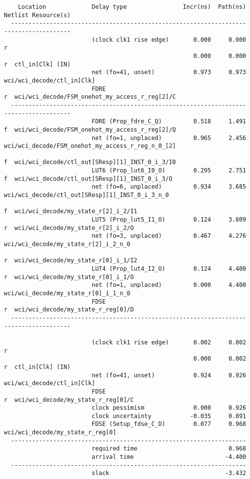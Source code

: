 \documentclass{article}
\begin{document}
\begin{lstlisting}
    Location             Delay type                Incr(ns)  Path(ns)    Netlist Resource(s)
  -------------------------------------------------------------------    -------------------
                         (clock clk1 rise edge)       0.000     0.000 r  
                                                      0.000     0.000 r  ctl_in[Clk] (IN)
                         net (fo=41, unset)           0.973     0.973    wci/wci_decode/ctl_in[Clk]
                         FDRE                                         r  wci/wci_decode/FSM_onehot_my_access_r_reg[2]/C
  -------------------------------------------------------------------    -------------------
                         FDRE (Prop_fdre_C_Q)         0.518     1.491 f  wci/wci_decode/FSM_onehot_my_access_r_reg[2]/Q
                         net (fo=1, unplaced)         0.965     2.456    wci/wci_decode/FSM_onehot_my_access_r_reg_n_0_[2]
                                                                      f  wci/wci_decode/ctl_out[SResp][1]_INST_0_i_3/I0
                         LUT6 (Prop_lut6_I0_O)        0.295     2.751 f  wci/wci_decode/ctl_out[SResp][1]_INST_0_i_3/O
                         net (fo=6, unplaced)         0.934     3.685    wci/wci_decode/ctl_out[SResp][1]_INST_0_i_3_n_0
                                                                      f  wci/wci_decode/my_state_r[2]_i_2/I1
                         LUT5 (Prop_lut5_I1_O)        0.124     3.809 r  wci/wci_decode/my_state_r[2]_i_2/O
                         net (fo=3, unplaced)         0.467     4.276    wci/wci_decode/my_state_r[2]_i_2_n_0
                                                                      r  wci/wci_decode/my_state_r[0]_i_1/I2
                         LUT4 (Prop_lut4_I2_O)        0.124     4.400 r  wci/wci_decode/my_state_r[0]_i_1/O
                         net (fo=1, unplaced)         0.000     4.400    wci/wci_decode/my_state_r[0]_i_1_n_0
                         FDSE                                         r  wci/wci_decode/my_state_r_reg[0]/D
  -------------------------------------------------------------------    -------------------

                         (clock clk1 rise edge)       0.002     0.002 r  
                                                      0.000     0.002 r  ctl_in[Clk] (IN)
                         net (fo=41, unset)           0.924     0.926    wci/wci_decode/ctl_in[Clk]
                         FDSE                                         r  wci/wci_decode/my_state_r_reg[0]/C
                         clock pessimism              0.000     0.926    
                         clock uncertainty           -0.035     0.891    
                         FDSE (Setup_fdse_C_D)        0.077     0.968    wci/wci_decode/my_state_r_reg[0]
  -------------------------------------------------------------------
                         required time                          0.968    
                         arrival time                          -4.400    
  -------------------------------------------------------------------
                         slack                                 -3.432    





\end{lstlisting}
\end{document}

